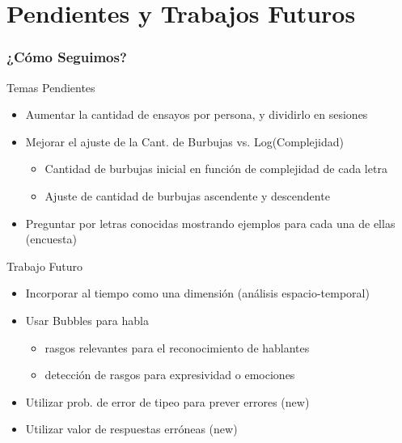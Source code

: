 \documentclass[10pt]{beamer}
\begin{document}
  \section{Pendientes y Trabajos Futuros}
	\begin{frame}
	\frametitle{¿C\'omo Seguimos?}
	  \begin{block}{Temas Pendientes}
	    \begin{itemize}
		\item Aumentar la cantidad de ensayos por persona, y dividirlo en sesiones
		\item Mejorar el ajuste de la Cant. de Burbujas vs. Log(Complejidad)
		\begin{itemize}
		      \item Cantidad de burbujas inicial en función de complejidad de cada letra
		      \item Ajuste de cantidad de burbujas ascendente y descendente
		\end{itemize}
		\item Preguntar por letras conocidas mostrando ejemplos para cada una de ellas (encuesta)
	    \end{itemize}
	  \end{block} \pause

	  \begin{block}{Trabajo Futuro}
	   \begin{itemize}
		\item Incorporar al tiempo como una dimensi\'on (an\'alisis espacio-temporal)
		\item Usar Bubbles para habla
		    \begin{itemize}
		      \item rasgos relevantes para el reconocimiento de hablantes
		      \item detección de rasgos para expresividad o emociones
		    \end{itemize}
		\item Utilizar prob. de error de tipeo para prever errores (\alert{new})
		\item Utilizar valor de respuestas erróneas (\alert{new})
	    \end{itemize}                     
	  \end{block}	    
	\end{frame}

\author[Christian, Miguel, Mail\'en]{Mail\'en G\'omez Mayol,\\Miguel Mart\'inez Soler,\\Christian Cossio Mercado}
\end{document}
